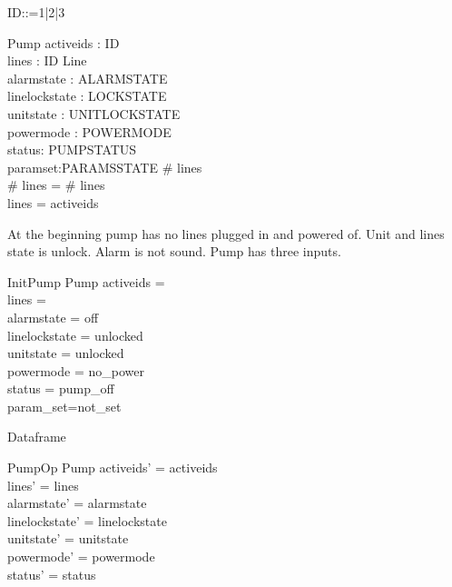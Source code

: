 \documentclass{article}
\begin{document}
	\begin{zed}
		ID::=1|2|3
	\end{zed}
		
	\begin{schema}{Pump}
		activeids : \power ID\\
		lines : ID \pfun Line \\
		alarmstate : ALARMSTATE \\
		linelockstate : LOCKSTATE \\
		unitstate : UNITLOCKSTATE \\
		powermode : POWERMODE \\
		status: PUMPSTATUS\\
		paramset:PARAMSSTATE
	\where
		\# \ran lines \\
		\# \ran lines = \# \dom lines\\
		\dom lines = activeids\\
	\end{schema}
	
	At the beginning pump has no lines plugged in and powered of.
	Unit and lines state is unlock. Alarm is not sound. 
	Pump has three inputs.	
	
	\begin{schema}{InitPump}
		Pump
		\where
		activeids = \emptyset \\
		lines = \emptyset \\
		alarmstate = off \\
		linelockstate = unlocked \\
		unitstate  = unlocked \\
		powermode =  no\_power \\
		status = pump\_off\\
		param\_set=not\_set	
	\end{schema}
	
	Dataframe
	\begin{schema}{PumpOp}
		\Delta Pump
	\where
    	activeids' = activeids \\
    	lines' = lines  \\
    	alarmstate' = alarmstate \\
    	linelockstate' = linelockstate  \\
    	unitstate' = unitstate \\
    	powermode' = powermode \\
    	status' = status \\
    \end{schema}
	
\end{document}
